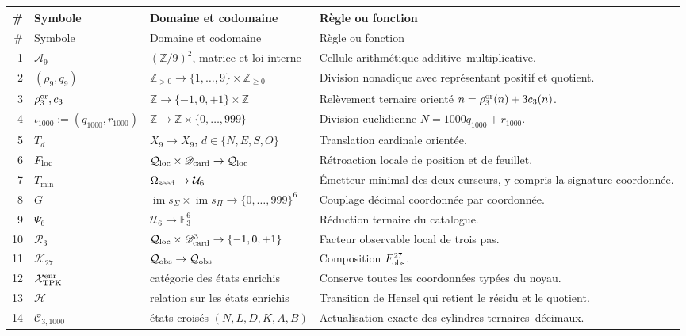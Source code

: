 \begingroup
\scriptsize
\renewcommand{\arraystretch}{1.12}
\begin{longtable}{@{}r p{}p{}p{}@{}}
\toprule
\#&Symbole&Domaine et codomaine&Règle ou fonction\\
\midrule
\endfirsthead
\toprule
\#&Symbole&Domaine et codomaine&Règle ou fonction\\
\midrule
\endhead
1&\(\mathcal A_9\)&\((\mathbb Z/9)^2\), matrice et loi interne&
Cellule arithmétique additive--multiplicative.\\
2&\((\rho_9,q_9)\)&\(\mathbb Z_{>0}\to
\{1,\ldots,9\}\times\mathbb Z_{\geq0}\)&
Division nonadique avec représentant positif et quotient.\\
3&\(\rho_3^{\rm or},c_3\)&\(\mathbb Z\to
\{-1,0,+1\}\times\mathbb Z\)&
Relèvement ternaire orienté \(n=\rho_3^{\rm or}(n)+3c_3(n)\).\\
4&\(\iota_{1000}:=(q_{1000},r_{1000})\)&\(\mathbb Z\to
\mathbb Z\times\{0,\ldots,999\}\)&
Division euclidienne \(N=1000q_{1000}+r_{1000}\).\\
5&\(T_d\)&\(X_9\to X_9\), \(d\in\{N,E,S,O\}\)&
Translation cardinale orientée.\\
6&\(F_{\rm loc}\)&\(\mathcal Q_{\rm loc}\times
\mathscr D_{\rm card}\to\mathcal Q_{\rm loc}\)&
Rétroaction locale de position et de feuillet.\\
7&\(T_{\min}\)&\(\Omega_{\rm seed}\to\mathcal U_6\)&
Émetteur minimal des deux curseurs, y compris la signature coordonnée.\\
8&\(G\)&\(\operatorname{im}s_\Sigma\times
\operatorname{im}s_\Pi\to\{0,\ldots,999\}^6\)&
Couplage décimal coordonnée par coordonnée.\\
9&\(\Psi_6\)&\(\mathcal U_6\to\mathbb F_3^6\)&
Réduction ternaire du catalogue.\\
10&\(\mathcal R_3\)&\(\mathcal Q_{\rm loc}\times
\mathscr D_{\rm card}^3\to\{-1,0,+1\}\)&
Facteur observable local de trois pas.\\
11&\(\mathcal K_{27}\)&\(\mathcal Q_{\rm obs}\to\mathcal Q_{\rm obs}\)&
Composition \(F_{\rm obs}^{27}\).\\
12&\(\mathcal X_{\rm TPK}^{\rm enr}\)&catégorie des états enrichis&
Conserve toutes les coordonnées typées du noyau.\\
13&\(\mathcal H\)&relation sur les états enrichis&
Transition de Hensel qui retient le résidu et le quotient.\\
14&\(\mathcal C_{3,1000}\)&états croisés
\((N,L,D,K,A,B)\)&
Actualisation exacte des cylindres ternaires--décimaux.\\

\end{longtable}
